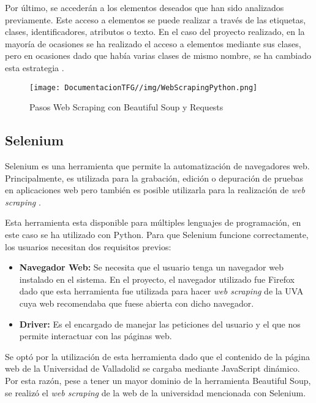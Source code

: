 Por último, se accederán a los elementos deseados que han sido analizados previamente. Este acceso a elementos se puede realizar a través de las etiquetas, clases, identificadores, atributos o texto. En el caso del proyecto realizado, en la mayoría de ocasiones se ha realizado el acceso a elementos mediante sus clases, pero en ocasiones dado que había varias clases de mismo nombre, se ha cambiado esta estrategia \cite{beautifulsoup:latex}.

\begin{figure}[H]
    \centering
    \texttt{[image: DocumentacionTFG//img/WebScrapingPython.png]}
    \caption{Pasos Web Scraping con Beautiful Soup y Requests}
    \label{fig:enter-label}
\end{figure}

\subsection{Selenium}
Selenium es una herramienta que permite la automatización de navegadores web. Principalmente, es utilizada para la grabación, edición o depuración de pruebas en aplicaciones web pero también es posible utilizarla para la realización de \textit{web scraping} \cite{selenium:latex}.

Esta herramienta esta disponible para múltiples lenguajes de programación, en este caso se ha utilizado con Python. Para que Selenium funcione correctamente, los usuarios necesitan dos requisitos previos:

\begin{itemize}
    \item \textbf{Navegador Web:} Se necesita que el usuario tenga un navegador web instalado en el sistema. En el proyecto, el navegador utilizado fue Firefox dado que esta herramienta fue utilizada para hacer \textit{web scraping} de la UVA cuya web recomendaba que fuese abierta con dicho navegador.
    \item \textbf{Driver:} Es el encargado de manejar las peticiones del usuario y el que nos permite interactuar con las páginas web.
\end{itemize}

Se optó por la utilización de esta herramienta dado que el contenido de la página web de la Universidad de Valladolid se cargaba mediante JavaScript dinámico. Por esta razón, pese a tener un mayor dominio de la herramienta Beautiful Soup, se realizó el \textit{web scraping} de la web de la universidad mencionada con Selenium.

